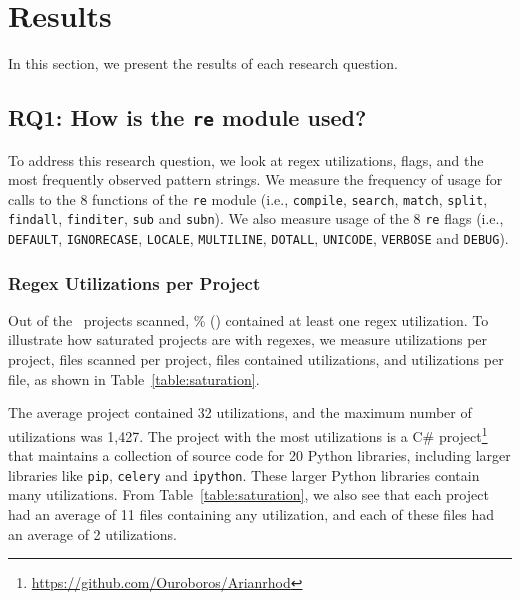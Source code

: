 \section{Results}
\label{sec:results}

In this section, we present the results of each research question.

\subsection{RQ1: How  is the {\tt re} module used?}
To address this research question, we look at regex utilizations, flags, and the most frequently observed pattern strings.
We measure the frequency of usage for calls to the 8 functions of the {\tt re} module (i.e., {\tt compile}, {\tt search}, {\tt match}, {\tt split}, {\tt findall}, {\tt finditer}, {\tt sub} and {\tt subn}).
We also measure usage of the 8 {\tt re} flags (i.e., {\tt DEFAULT}, {\tt IGNORECASE}, {\tt LOCALE}, {\tt MULTILINE}, {\tt DOTALL}, {\tt UNICODE}, {\tt VERBOSE} and {\tt DEBUG}).



\subsubsection{Regex Utilizations per Project}
Out of the \ projects scanned, \% () contained at least one regex utilization.  To illustrate how saturated projects are with regexes, we measure utilizations per project, files scanned per project, files contained utilizations, and  utilizations  per file, as shown in Table~\ref{table:saturation}.

The average project contained 32 utilizations, and the maximum number of utilizations was 1,427.  The project with the most utilizations is a C\# project\footnote{\url{https://github.com/Ouroboros/Arianrhod}} that maintains a collection of source code for 20 Python libraries, including larger libraries like {\tt pip}, {\tt celery} and {\tt ipython}.  These larger Python libraries contain many utilizations.
From Table~\ref{table:saturation}, we also see that each project had an average of 11 files containing any utilization, and each of these files had an average of 2 utilizations.



